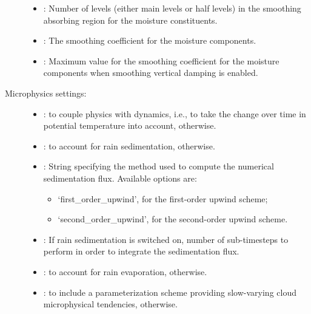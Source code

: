\documentclass[letterpaper,10pt,english]{sphinxmanual}
\begin{document}
\begin{description}
\begin{itemize}
\item {} 
: Number of levels (either main levels or half levels)           in the smoothing absorbing region for the moisture constituents.

\item {} 
: The smoothing coefficient for the moisture components.

\item {} 
: Maximum value for the smoothing coefficient for            the moisture components when smoothing vertical damping is enabled.

\end{itemize}

\item[{Microphysics settings:}] \leavevmode\begin{itemize}
\item {} 
:  to couple physics with dynamics,                 i.e., to take the change over time in potential temperature into account,  otherwise.

\item {} 
:  to account for rain sedimentation,  otherwise.

\item {} 
: String specifying the method used to compute the numerical                sedimentation flux. Available options are:
\begin{itemize}
\item {} 
‘first\_order\_upwind’, for the first-order upwind scheme;

\item {} 
‘second\_order\_upwind’, for the second-order upwind scheme.

\end{itemize}

\item {} 
: If rain sedimentation is switched on, number of sub-timesteps              to perform in order to integrate the sedimentation flux.

\item {} 
:  to account for rain evaporation,  otherwise.

\item {} 
:  to include a parameterization scheme            providing slow-varying cloud microphysical tendencies,  otherwise.


\end{itemize}
\end{description}
\end{document}
